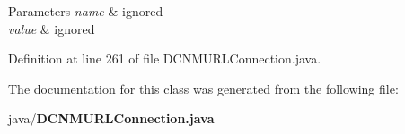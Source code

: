 \begin{DoxyParams}{Parameters}
{\em name} & ignored \\
\hline
{\em value} & ignored \\
\hline
\end{DoxyParams}


Definition at line 261 of file D\+C\+N\+M\+U\+R\+L\+Connection.\+java.



The documentation for this class was generated from the following file\+:\begin{DoxyCompactItemize}
\item 
java/{\bf D\+C\+N\+M\+U\+R\+L\+Connection.\+java}\end{DoxyCompactItemize}
